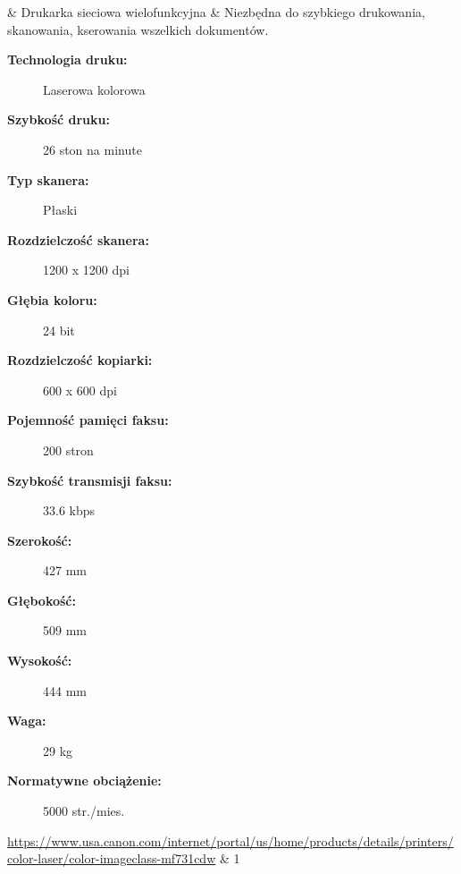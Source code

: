 \begin{center}
\begin{longtabu}
\rownumber &  Drukarka sieciowa 		
				wielofunkcyjna	& Niezbędna do szybkiego drukowania, skanowania, kserowania wszelkich dokumentów.
										\begin{description}
												\item[\textbf{Technologia druku:}] Laserowa kolorowa
												\item[\textbf{Szybkość druku:}] 26 ston na minute
												\item[\textbf{Typ skanera:}] Płaski
												\item[\textbf{Rozdzielczość skanera:}] 1200 x 1200 dpi
												\item[\textbf{Głębia koloru:}] 24 bit
												\item[\textbf{Rozdzielczość kopiarki:}] 600 x 600 dpi
												\item[\textbf{Pojemność pamięci faksu:}] 200 stron
												\item[\textbf{Szybkość transmisji faksu:}] 33.6 kbps
												\item[\textbf{Szerokość:}] 427 mm
												\item[\textbf{Głębokość:}] 509 mm
												\item[\textbf{Wysokość:}] 444 mm
												\item[\textbf{Waga:}] 29 kg
												\item[\textbf{Normatywne obciążenie:}] 5000 str./mies. 
										\end{description}											
										\url{https://www.usa.canon.com/internet/portal/us/home/products/details/printers/color-laser/color-imageclass-mf731cdw}
										& 1 \\ \hline	
										

\end{longtabu}
\end{center}
